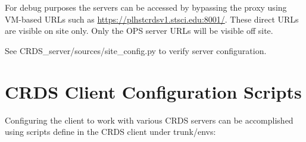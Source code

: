 \documentclass[letterpaper,10pt,english]{sphinxmanual}
\begin{document}
For debug purposes the servers can be accessed by bypassing the proxy using VM-based URLs such
as \href{https://plhstcrdsv1.stsci.edu:8001/}{https://plhstcrdsv1.stsci.edu:8001/}.  These direct URLs are visible on site only.  Only the OPS
server URLs will be visible off site.

See CRDS\_server/sources/site\_config.py to verify server configuration.


\section{CRDS Client Configuration Scripts}
\label{server_guide:crds-client-configuration-scripts}
Configuring the client to work with various CRDS servers can be accomplished using scripts define in the CRDS client
under trunk/envs:
\end{document}

